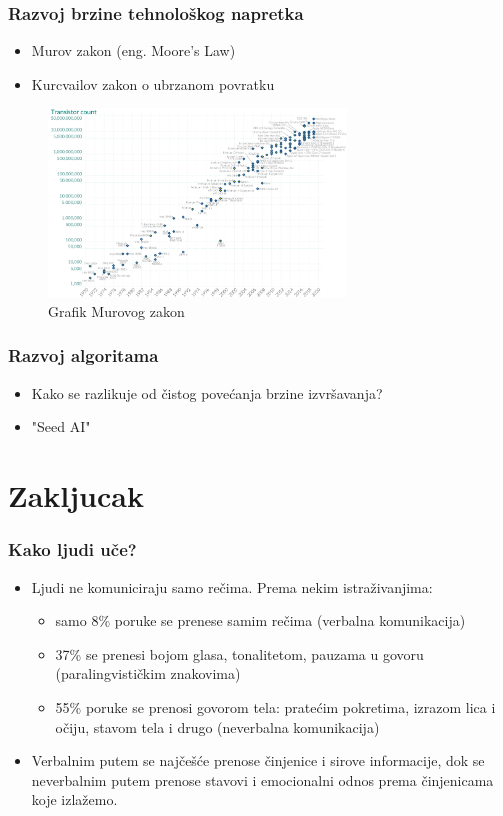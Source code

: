 \documentclass{beamer}
\begin{document}
\begin{frame}[fragile]\frametitle{Razvoj brzine tehnološkog napretka}
    \begin{itemize}	
        \item Murov zakon (eng. Moore's Law)
        \item Kurcvailov zakon o ubrzanom povratku
    \end{itemize}
    \begin{figure}[h!]
        \centering\includegraphics[height=5cm]{moore.png} 
        \caption{Grafik Murovog zakon}
        \label{fig:murovzakon}
    \end{figure}
\end{frame}


\begin{frame}[fragile]\frametitle{Razvoj algoritama}
    \begin{itemize}	
        \item Kako se razlikuje od čistog povećanja brzine izvršavanja?
        \item "Seed AI"
    \end{itemize}
\end{frame}

\section{Zakljucak}

\begin{frame}[fragile]\frametitle{Kako ljudi uče?}
	\begin{itemize}	
		\item Ljudi ne komuniciraju samo rečima. Prema nekim
		istraživanjima:
		\begin{itemize}
			\item samo 8\% poruke se prenese samim rečima (verbalna komunikacija)
			\item 37\% se prenesi bojom glasa, tonalitetom, pauzama u govoru (paralingvističkim znakovima)
			\item 55\% poruke se prenosi govorom tela: pratećim pokretima, izrazom lica i
			očiju, stavom tela i drugo (neverbalna komunikacija)
		\end{itemize}
		\item Verbalnim putem se najčešće prenose činjenice i
		sirove informacije, dok se neverbalnim putem prenose stavovi i
		emocionalni odnos prema činjenicama koje izlažemo.
	\end{itemize}
\end{frame}
\end{document}
